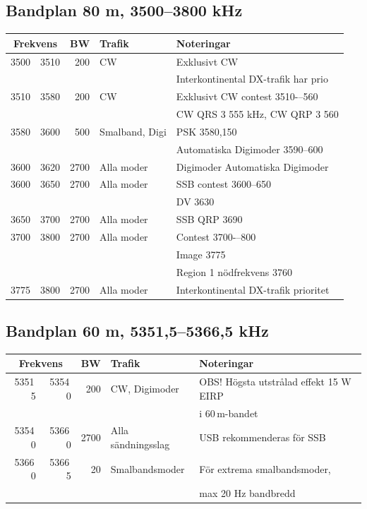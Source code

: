 \subsection*{Bandplan 80 m, 3500--3800 kHz}
\begin{tabular}{rrrll}
\multicolumn{2}{c}{\textbf{Frekvens}} & \textbf{BW} & \textbf{Trafik} & \textbf{Noteringar} \\ \hline
3500 & 3510 & 200  & CW             & Exklusivt CW                         \\
      &       &      &                & Interkontinental DX-trafik har prio  \\ \hline
3510 & 3580 & 200  & CW             & Exklusivt CW contest 3510-–560       \\
      &       &      &                & CW QRS 3 555 kHz, CW QRP 3 560       \\ \hline
3580 & 3600 & 500  & Smalband, Digi & PSK 3580,150                        \\
      &       &      &                & Automatiska Digimoder 3590--600     \\ \hline
3600 & 3620 & 2700 & Alla moder     & Digimoder Automatiska Digimoder      \\ \hline
3600 & 3650 & 2700 & Alla moder     & SSB contest 3600--650               \\
      &       &      &                & DV 3630                             \\ \hline
3650 & 3700 & 2700 & Alla moder     & SSB QRP 3690                        \\ \hline
3700 & 3800 & 2700 & Alla moder     & Contest 3700-–800                   \\
      &       &      &                & Image 3775                          \\
      &       &      &                & Region 1 nödfrekvens 3760           \\ \hline
3775 & 3800 & 2700 & Alla moder     & Interkontinental DX-trafik prioritet \\ \hline
\end{tabular}


\subsection*{Bandplan 60 m, 5351,5--5366,5 kHz}
\begin{tabular}{rrrll}
\multicolumn{2}{c}{\textbf{Frekvens}} & \textbf{BW} & \textbf{Trafik} & \textbf{Noteringar} \\ \hline
5351\,5 & 5354\,0 &  200 & CW, Digimoder      & OBS! Högsta utstrålad effekt 15 W EIRP\\
        &         &      &                    & i 60\,m-bandet\\ \hline
5354\,0 & 5366\,0 & 2700 & Alla sändningsslag & USB rekommenderas för SSB\\ \hline
5366\,0 & 5366\,5 &   20 & Smalbandsmoder     & För extrema smalbandsmoder,\\
        &         &      &                    & max 20 Hz bandbredd\\ \hline
\end{tabular}

